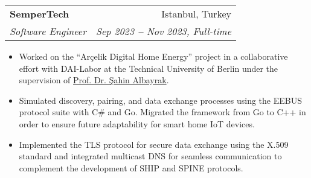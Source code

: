 \documentclass[letterpaper,11pt]{article}
\makeatletter
\newcommand{\resumeItem}[1]{
  \item\small{
    {#1 \vspace{-2pt}}
  }
}
\newcommand{\resumeSubheading}[4]{
  \vspace{-2pt}\item
    \begin{tabular*}{0.97\textwidth}[t]{l@{\extracolsep{\fill}}r}
      \textbf{#1} & #2 \\
      \textit{\small#3} & \textit{\small #4} \\
    \end{tabular*}\vspace{-7pt}
}
\newcommand{\resumeItemListStart}{\begin{itemize}}
\newcommand{\resumeItemListEnd}{\end{itemize}\vspace{-5pt}}
\makeatother
\begin{document}
    \resumeSubheading
      {SemperTech}{Istanbul, Turkey}
      {Software Engineer}{Sep 2023 \textbf{--} Nov 2023, Full-time}
        \resumeItemListStart
            \resumeItem{Worked on the “Arçelik Digital Home Energy” project in a collaborative effort with DAI-Labor at the Technical University of Berlin under the supervision of \href{https://www.linkedin.com/in/prof-dr-dr-h-c-sahin-albayrak-65452a1/}{\color{blue}Prof. Dr. Şahin Albayrak}.}
            \resumeItem{Simulated discovery, pairing, and data exchange processes using the EEBUS protocol suite with C\# and Go. Migrated the framework from Go to C++ in order to ensure future adaptability for smart home IoT devices.}
            \resumeItem{Implemented the TLS protocol for secure data exchange using the X.509 standard and integrated multicast DNS for seamless communication to complement the development of SHIP and SPINE protocols.}
        \resumeItemListEnd

\end{document}
